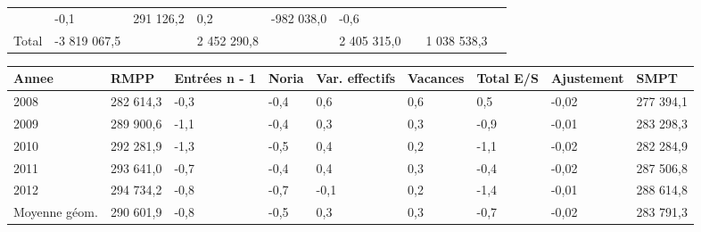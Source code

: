\begin{longtable}[]{@{}lllllllll@{}}
\begin{minipage}[t]{0.16\columnwidth}
\end{minipage} & \begin{minipage}[t]{0.06\columnwidth}\raggedright
-0,1\strut
\end{minipage} & \begin{minipage}[t]{0.12\columnwidth}\raggedright
291 126,2\strut
\end{minipage} & \begin{minipage}[t]{0.06\columnwidth}\raggedright
0,2\strut
\end{minipage} & \begin{minipage}[t]{0.10\columnwidth}\raggedright
-982 038,0\strut
\end{minipage} & \begin{minipage}[t]{0.06\columnwidth}\raggedright
-0,6\strut
\end{minipage}\tabularnewline
\begin{minipage}[t]{0.05\columnwidth}\raggedright
Total\strut
\end{minipage} & \begin{minipage}[t]{0.10\columnwidth}\raggedright
-3 819 067,5\strut
\end{minipage} & \begin{minipage}[t]{0.06\columnwidth}\raggedright
\strut
\end{minipage} & \begin{minipage}[t]{0.16\columnwidth}\raggedright
2 452 290,8\strut
\end{minipage} & \begin{minipage}[t]{0.06\columnwidth}\raggedright
\strut
\end{minipage} & \begin{minipage}[t]{0.12\columnwidth}\raggedright
2 405 315,0\strut
\end{minipage} & \begin{minipage}[t]{0.06\columnwidth}\raggedright
\strut
\end{minipage} & \begin{minipage}[t]{0.10\columnwidth}\raggedright
1 038 538,3\strut
\end{minipage} & \begin{minipage}[t]{0.06\columnwidth}\raggedright
\strut
\end{minipage}\tabularnewline
\bottomrule
\end{longtable}

\begin{longtable}[]{@{}lllllllll@{}}
\toprule
Annee & RMPP & Entrées n - 1 & Noria & Var. effectifs & Vacances & Total
E/S & Ajustement & SMPT\tabularnewline
\midrule
\endhead
2008 & 282 614,3 & -0,3 & -0,4 & 0,6 & 0,6 & 0,5 & -0,02 & 277
394,1\tabularnewline
2009 & 289 900,6 & -1,1 & -0,4 & 0,3 & 0,3 & -0,9 & -0,01 & 283
298,3\tabularnewline
2010 & 292 281,9 & -1,3 & -0,5 & 0,4 & 0,2 & -1,1 & -0,02 & 282
284,9\tabularnewline
2011 & 293 641,0 & -0,7 & -0,4 & 0,4 & 0,3 & -0,4 & -0,02 & 287
506,8\tabularnewline
2012 & 294 734,2 & -0,8 & -0,7 & -0,1 & 0,2 & -1,4 & -0,01 & 288
614,8\tabularnewline
Moyenne géom. & 290 601,9 & -0,8 & -0,5 & 0,3 & 0,3 & -0,7 & -0,02 & 283
791,3\tabularnewline
\bottomrule
\end{longtable}

